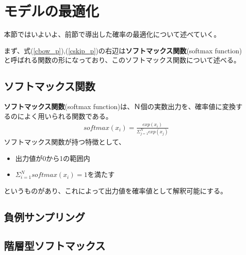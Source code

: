 \section{モデルの最適化}
本節ではいよいよ、前節で導出した確率の最適化について述べていく。

まず、式(\ref{cbow_p}),(\ref{cskip_p})の右辺は\textbf{ソフトマックス関数}(softmax function)と呼ばれる関数の形になっており、このソフトマックス関数について述べる。

\subsection{ソフトマックス関数}
\textbf{ソフトマックス関数}(softmax function)は、Ｎ個の実数出力を、確率値に変換するのによく用いられる関数である。
\begin{eqnarray}
  \label{softmax_p}
  softmax(x_i) = \frac{exp(x_i)}{\Sigma_{j=1}^{N}exp(x_j)}
\end{eqnarray}
ソフトマックス関数が持つ特徴として、
\begin{itemize}
  \item 出力値が0から1の範囲内
  \item $\Sigma_{i=1}^Nsoftmax(x_i)=1$を満たす
\end{itemize}
というものがあり、これによって出力値を確率値として解釈可能にする。

\subsection{}

\subsection{負例サンプリング}

\subsection{階層型ソフトマックス}
